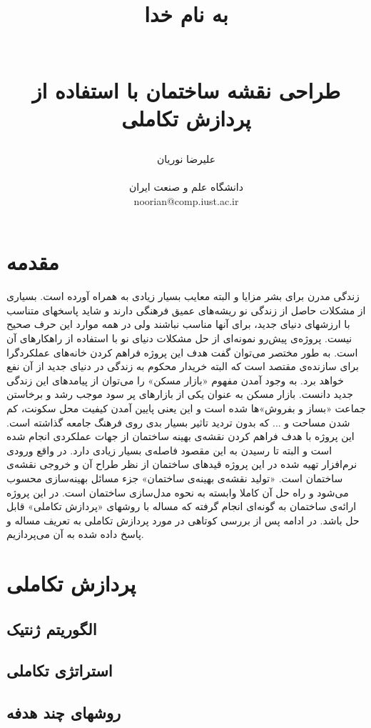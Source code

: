 \documentclass{report}
\title{ 
\begin{normalsize} به نام خدا \end{normalsize}
\\[7cm]
طراحی نقشه ساختمان با استفاده از پردازش تکاملی
\\[3cm]
}
\author{علیرضا نوریان
\\
\\ \small دانشگاه علم و صنعت ایران
\\ \small noorian@comp.iust.ac.ir
}
\begin{document}
\maketitle

\tableofcontents

\begin{abstract}

\end{abstract}

\section{مقدمه}
زندگی مدرن برای بشر مزایا و البته معایب بسیار زیادی به همراه آورده است. بسیاری از مشکلات حاصل از زندگی نو ریشه‌های عمیق فرهنگی دارند و شاید پاسخهای متناسب با ارزشهای دنیای جدید، برای آنها مناسب نباشند ولی در همه موارد این حرف صحیح نیست. پروژه‌ی پیش‌رو نمونه‌ای از حل مشکلات دنیای نو با استفاده از راهکارهای آن است. به طور مختصر می‌توان گفت هدف این پروژه فراهم کردن خانه‌های عملکردگرا برای سازنده‌ی مقتصد است که البته خریدار محکوم به زندگی در دنیای جدید از آن نفع خواهد برد.
به وجود آمدن مفهوم «بازار مسکن» را می‌توان از پیامدهای این زندگی جدید دانست. بازار مسکن به عنوان یکی از بازارهای پر سود موجب رشد و برخاستن جماعت «بساز و بفروش»ها شده است و این یعنی پایین آمدن کیفیت محل سکونت، کم شدن مساحت و ... که بدون تردید تاثیر بسیار بدی روی فرهنگ جامعه گذاشته است. این پروژه با هدف فراهم کردن نقشه‌ی بهینه ساختمان از جهات عملکردی انجام شده است و البته تا رسیدن به این مقصود فاصله‌ی بسیار زیادی دارد. در واقع ورودی نرم‌افزار تهیه شده در این پروژه قیدهای ساختمان از نظر طراح آن و خروجی نقشه‌ی ساختمان است.
«تولید نقشه‌ی بهینه‌ی ساختمان» جزء مسائل بهینه‌سازی محسوب می‌شود و راه حل آن کاملا وابسته به نحوه مدل‌سازی ساختمان است. در این پروژه ارائه‌ی ساختمان به گونه‌ای انجام گرفته که مساله با روشهای «پردازش تکاملی» قابل حل باشد. در ادامه پس از بررسی کوتاهی در مورد پردازش تکاملی به تعریف مساله و پاسخ داده شده به آن می‌پردازیم.

\section{پردازش تکاملی}
\subsection{الگوریتم ژنتیک}
\subsection{استراتژی تکاملی}
\subsection{روشهای چند هدفه}
\end{document}
